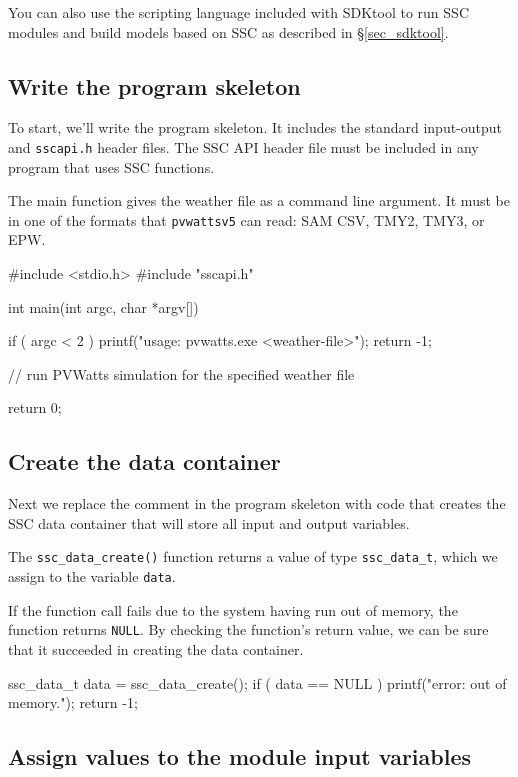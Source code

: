 \documentclass{scrartcl} %
\begin{document}
You can also use the scripting language included with SDKtool to run SSC modules and build models based on SSC as described in \S\ref{sec_sdktool}.

\subsection{Write the program skeleton}

To start, we'll write the program skeleton. It includes the standard input-output and  \texttt{sscapi.h} header files. The SSC API header file must be included in any program that uses SSC functions.

The main function gives the weather file as a command line argument. It must be in one of the formats that \texttt{pvwattsv5} can read: SAM CSV, TMY2, TMY3, or EPW.

\begin{verbatimtab}[4]
#include <stdio.h>
#include "sscapi.h"

int main(int argc, char *argv[])
{
	if ( argc < 2 )
	{
		printf("usage: pvwatts.exe <weather-file>\n");
		return -1;
	}
 
	// run PVWatts simulation for the specified weather file
	
	return 0;
}
\end{verbatimtab}

\subsection{Create the data container}

Next we replace the comment in the program skeleton with code that creates the SSC data container that will store all input and output variables.
 
The \texttt{ssc\_data\_create()} function returns a value of type \texttt{ssc\_data\_t}, which we assign to the variable \texttt{data}.

If the function call fails due to the system having run out of memory, the function returns \texttt{NULL}. By checking the function's return value, we can be sure that it succeeded in creating the data container.

\begin{verbatimtab}[4]
	ssc_data_t data = ssc_data_create();
	if ( data == NULL )
	{
		printf("error: out of memory.\n");
		return -1;
	}
\end{verbatimtab}

\subsection{Assign values to the module input variables}
\end{document}

